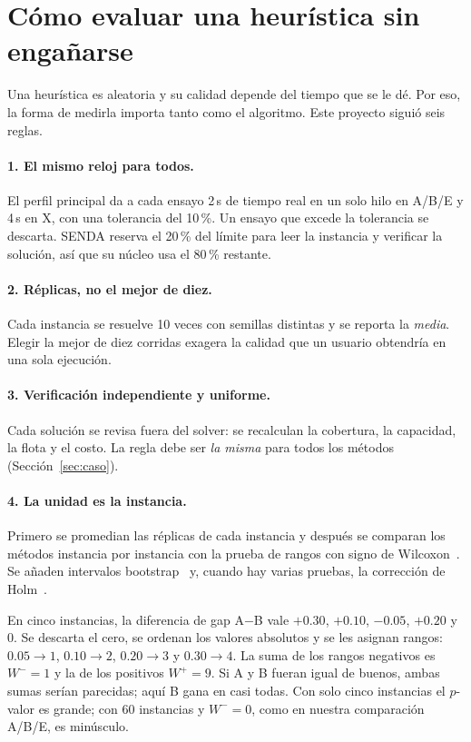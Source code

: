 \documentclass[11pt,a4paper]{article}
\begin{document}
\section{Cómo evaluar una heurística sin engañarse}
\label{sec:evaluar}

Una heurística es aleatoria y su calidad depende del tiempo que se le dé. Por eso, la forma de
medirla importa tanto como el algoritmo. Este proyecto siguió seis reglas.

\paragraph{1. El mismo reloj para todos.} El perfil principal da a cada ensayo 2\,s de tiempo real
en un solo hilo en A/B/E y 4\,s en X, con una tolerancia del 10\,\%. Un ensayo que excede la
tolerancia se descarta. SENDA reserva el 20\,\% del límite para leer la instancia y verificar la
solución, así que su núcleo usa el 80\,\% restante.

\paragraph{2. Réplicas, no el mejor de diez.} Cada instancia se resuelve 10 veces con semillas
distintas y se reporta la \emph{media}. Elegir la mejor de diez corridas exagera la calidad que un
usuario obtendría en una sola ejecución.

\paragraph{3. Verificación independiente y uniforme.} Cada solución se revisa fuera del solver: se
recalculan la cobertura, la capacidad, la flota y el costo. La regla debe ser \emph{la misma} para
todos los métodos (Sección~\ref{sec:caso}).

\paragraph{4. La unidad es la instancia.} Primero se promedian las réplicas de cada instancia y
después se comparan los métodos instancia por instancia con la prueba de rangos con signo de
Wilcoxon~\cite{wilcoxon1945}. Se añaden intervalos bootstrap~\cite{efron1979} y, cuando hay varias
pruebas, la corrección de Holm~\cite{holm1979}.

\begin{ejemplo}
En cinco instancias, la diferencia de gap A$-$B vale $+0.30$, $+0.10$, $-0.05$, $+0.20$ y $0$. Se
descarta el cero, se ordenan los valores absolutos y se les asignan rangos: $0.05\to1$, $0.10\to2$,
$0.20\to3$ y $0.30\to4$. La suma de los rangos negativos es $W^-=1$ y la de los positivos $W^+=9$.
Si A y B fueran igual de buenos, ambas sumas serían parecidas; aquí B gana en casi todas. Con solo
cinco instancias el $p$-valor es grande; con 60 instancias y $W^-=0$, como en nuestra comparación
A/B/E, es minúsculo.
\end{ejemplo}
\end{document}
